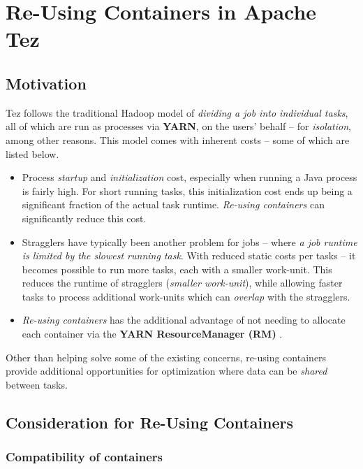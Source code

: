 \documentclass[twocolumn]{article}
\begin{document}
\section{Re-Using Containers in Apache Tez}
\subsection{Motivation}

Tez follows the traditional Hadoop model of \emph{dividing a job into
individual tasks}, all of which are run as processes via \textbf{YARN},
on the users' behalf -- for \emph{isolation}, among other reasons. This
model comes with inherent costs -- some of which are listed below.

\begin{itemize}

\item
  Process \emph{startup} and \emph{initialization} cost, especially when
  running a Java process is fairly high. For short running tasks, this
  initialization cost ends up being a significant fraction of the actual
  task runtime. \emph{Re-using containers} can significantly reduce this
  cost.

\item
  Stragglers have typically been another problem for jobs -- where
  \emph{a job runtime is limited by the slowest running task}. With
  reduced static costs per tasks -- it becomes possible to run more
  tasks, each with a smaller work-unit. This reduces the runtime of
  stragglers (\emph{smaller work-unit}), while allowing faster tasks to
  process additional work-units which can \emph{overlap} with the
  stragglers.\\
\item
  \emph{Re-using containers} has the additional advantage of not needing
  to allocate each container via the \textbf{YARN ResourceManager (RM)} \cite{Saha:2013-06}.
\end{itemize}

Other than helping solve some of the existing concerns, re-using
containers provide additional opportunities for optimization where data
can be \emph{shared} between tasks.

\subsection{Consideration for Re-Using Containers}

\subsubsection{Compatibility of containers}
\end{document}
